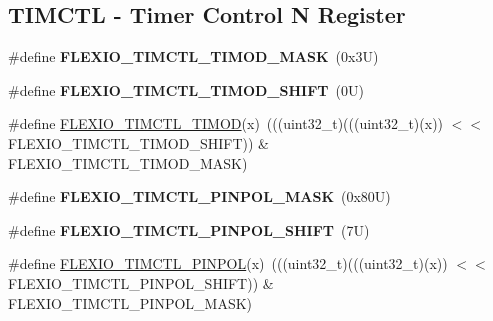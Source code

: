 \subsection*{T\+I\+M\+C\+TL -\/ Timer Control N Register}
\begin{DoxyCompactItemize}
\item 
\mbox{\label{group___f_l_e_x_i_o___register___masks_ga9bec496ee19246597117ab2ad0b485a2}} 
\#define {\bfseries F\+L\+E\+X\+I\+O\+\_\+\+T\+I\+M\+C\+T\+L\+\_\+\+T\+I\+M\+O\+D\+\_\+\+M\+A\+SK}~(0x3\+U)
\item 
\mbox{\label{group___f_l_e_x_i_o___register___masks_ga887263d6baab037213b250b19c9b8b92}} 
\#define {\bfseries F\+L\+E\+X\+I\+O\+\_\+\+T\+I\+M\+C\+T\+L\+\_\+\+T\+I\+M\+O\+D\+\_\+\+S\+H\+I\+FT}~(0\+U)
\item 
\#define \mbox{\hyperlink{group___f_l_e_x_i_o___register___masks_gacdc0e1840f91ebd492645712f7e61f76}{F\+L\+E\+X\+I\+O\+\_\+\+T\+I\+M\+C\+T\+L\+\_\+\+T\+I\+M\+OD}}(x)~(((uint32\+\_\+t)(((uint32\+\_\+t)(x)) $<$$<$ F\+L\+E\+X\+I\+O\+\_\+\+T\+I\+M\+C\+T\+L\+\_\+\+T\+I\+M\+O\+D\+\_\+\+S\+H\+I\+FT)) \& F\+L\+E\+X\+I\+O\+\_\+\+T\+I\+M\+C\+T\+L\+\_\+\+T\+I\+M\+O\+D\+\_\+\+M\+A\+SK)
\item 
\mbox{\label{group___f_l_e_x_i_o___register___masks_ga973b40601cee96aca7fc142da557f6d4}} 
\#define {\bfseries F\+L\+E\+X\+I\+O\+\_\+\+T\+I\+M\+C\+T\+L\+\_\+\+P\+I\+N\+P\+O\+L\+\_\+\+M\+A\+SK}~(0x80\+U)
\item 
\mbox{\label{group___f_l_e_x_i_o___register___masks_gae82563aa3c3cb002d98a50aaf00dfd90}} 
\#define {\bfseries F\+L\+E\+X\+I\+O\+\_\+\+T\+I\+M\+C\+T\+L\+\_\+\+P\+I\+N\+P\+O\+L\+\_\+\+S\+H\+I\+FT}~(7\+U)
\item 
\#define \mbox{\hyperlink{group___f_l_e_x_i_o___register___masks_ga35eb37b1292b993b43c4c56e35245831}{F\+L\+E\+X\+I\+O\+\_\+\+T\+I\+M\+C\+T\+L\+\_\+\+P\+I\+N\+P\+OL}}(x)~(((uint32\+\_\+t)(((uint32\+\_\+t)(x)) $<$$<$ F\+L\+E\+X\+I\+O\+\_\+\+T\+I\+M\+C\+T\+L\+\_\+\+P\+I\+N\+P\+O\+L\+\_\+\+S\+H\+I\+FT)) \& F\+L\+E\+X\+I\+O\+\_\+\+T\+I\+M\+C\+T\+L\+\_\+\+P\+I\+N\+P\+O\+L\+\_\+\+M\+A\+SK)
\item 
\mbox{\label{group___f_l_e_x_i_o___register___masks_ga4798db914ca4cccdb88b15814d08fce3}} 

\end{DoxyCompactItemize}
